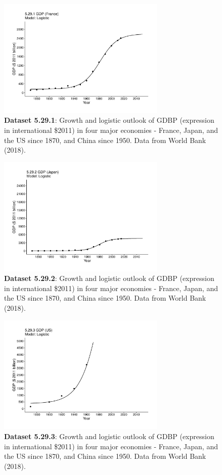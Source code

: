 \documentclass[aps,rmp,preprint,superscriptaddress,10pt,onecolumn]{article}
\begin{document}
\begin{figure}[h]
\includegraphics[width=8cm]{output/figs-ggplot/5.29.1.pdf}
\caption{\textbf{Dataset 5.29.1}: Growth and logistic outlook of GDBP (expression in international \$2011) in four major economies - France, Japan, and the US since 1870, and China since 1950. Data from World Bank (2018).}
\end{figure}
	
\begin{figure}[h]
\includegraphics[width=8cm]{output/figs-ggplot/5.29.2.pdf}
\caption{\textbf{Dataset 5.29.2}: Growth and logistic outlook of GDBP (expression in international \$2011) in four major economies - France, Japan, and the US since 1870, and China since 1950. Data from World Bank (2018).}
\end{figure}
	
\begin{figure}[h]
\includegraphics[width=8cm]{output/figs-ggplot/5.29.3.pdf}
\caption{\textbf{Dataset 5.29.3}: Growth and logistic outlook of GDBP (expression in international \$2011) in four major economies - France, Japan, and the US since 1870, and China since 1950. Data from World Bank (2018).}
\end{figure}
	
\end{document}
